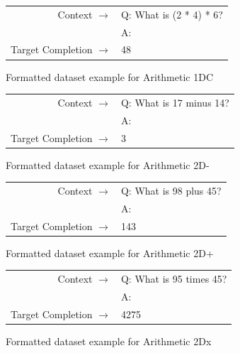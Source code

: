 \begin{figure} { \tt \footnotesize \begin{tabularx}{\linewidth}{r X} \toprule Context $\to$ & Q: What is (2 * 4) * 6? \\
 & A: \\
 \midrule Target Completion $\to$ & 48 \\
 \bottomrule \end{tabularx} }  \caption{Formatted dataset example for Arithmetic 1DC}  \label{eval:single_digit_three_ops}  \end{figure}%
\begin{figure} { \tt \footnotesize \begin{tabularx}{\linewidth}{r X} \toprule Context $\to$ & Q: What is 17 minus 14? \\
 & A: \\
 \midrule Target Completion $\to$ & 3 \\
 \bottomrule \end{tabularx} }  \caption{Formatted dataset example for Arithmetic 2D-}  \label{eval:two_digit_subtraction}  \end{figure}%
\begin{figure} { \tt \footnotesize \begin{tabularx}{\linewidth}{r X} \toprule Context $\to$ & Q: What is 98 plus 45? \\
 & A: \\
 \midrule Target Completion $\to$ & 143 \\
 \bottomrule \end{tabularx} }  \caption{Formatted dataset example for Arithmetic 2D+}  \label{eval:two_digit_addition}  \end{figure}%
    \begin{figure} { \tt \footnotesize \begin{tabularx}{\linewidth}{r X} \toprule Context $\to$ & Q: What is 95 times 45? \\
 & A: \\
 \midrule Target Completion $\to$ & 4275 \\
 \bottomrule \end{tabularx} }  \caption{Formatted dataset example for Arithmetic 2Dx}  \label{eval:two_digit_multiplication}  \end{figure}%
